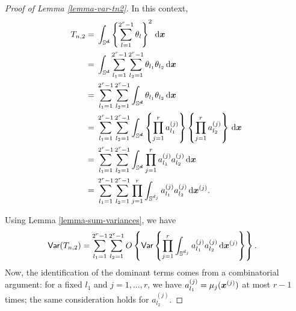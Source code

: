 \documentclass[oneside,11pt]{article}
\begin{document}
\begin{proof}[Proof of Lemma \ref{lemma-var-tn2}]
In this context,
\begin{align*}
    T_{n,2} =&\; \int_{\mathbb{S}^{\boldsymbol{d}}} \left\{\sum_{l=1}^{2^r-1} \theta_l\right\}^2 \,\mathrm{d} \boldsymbol{x} \\
    =&\; \int_{\mathbb{S}^{\boldsymbol{d}}} \sum_{l_1=1}^{2^r-1} \sum_{l_2=1}^{2^r-1} \theta_{l_1} \theta_{l_2} \,\mathrm{d} \boldsymbol{x} \\
    =&\; \sum_{l_1=1}^{2^r-1} \sum_{l_2=1}^{2^r-1} \int_{\mathbb{S}^{\boldsymbol{d}}} \theta_{l_1} \theta_{l_2} \,\mathrm{d} \boldsymbol{x} \\
    =&\; \sum_{l_1=1}^{2^r-1} \sum_{l_2=1}^{2^r-1} \int_{\mathbb{S}^{\boldsymbol{d}}} \left\{\prod_{j=1}^{r} a_{l_1}^{(j)}\right\} \left\{\prod_{j=1}^{r} a_{l_2}^{(j)}\right\} \,\mathrm{d} \boldsymbol{x} \\
    =&\; \sum_{l_1=1}^{2^r-1} \sum_{l_2=1}^{2^r-1} \int_{\mathbb{S}^{\boldsymbol{d}}} \prod_{j=1}^{r} a_{l_1}^{(j)} a_{l_2}^{(j)} \,\mathrm{d} \boldsymbol{x} \\
    =&\; \sum_{l_1=1}^{2^r-1} \sum_{l_2=1}^{2^r-1} \prod_{j=1}^{r} \int_{\mathbb{S}^{d_j}} a_{l_1}^{(j)} a_{l_2}^{(j)} \,\mathrm{d} \boldsymbol{x}^{(j)}.
\end{align*}

Using Lemma \ref{lemma-sum-variances}, we have
\begin{align*}
    \mathsf{Var} (T_{n,2}) &= \sum_{l_1=1}^{2^r-1} \sum_{l_2=1}^{2^r-1} O \left\{\mathsf{Var} \left\{\prod_{j=1}^{r} \int_{\mathbb{S}^{d_j}} a_{l_1}^{(j)} a_{l_2}^{(j)} \,\mathrm{d} \boldsymbol{x}^{(j)}\right\} \right\}.
\end{align*}
Now, the identification of the dominant terms comes from a combinatorial argument: for a fixed $l_1$ and $j = 1, \dots, r$, we have $a_{l_1}^{(j)} = \mu_j(\boldsymbol{x}^{(j)})$ at most $r-1$ times; the same consideration holds for $a_{l_2}^{(j)}$.


\end{proof}
\end{document}
